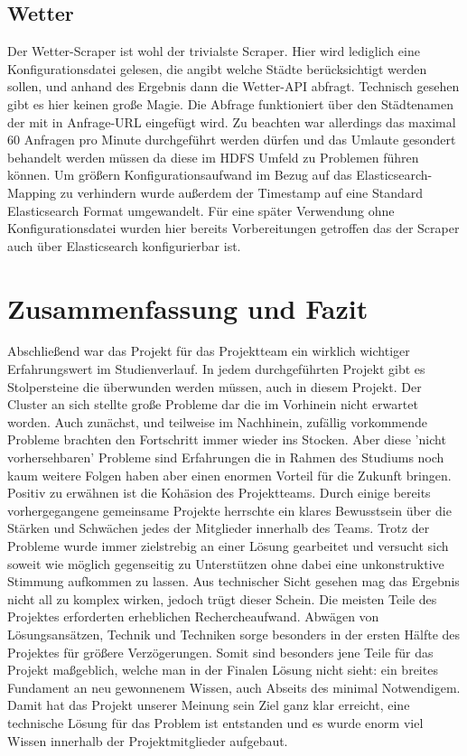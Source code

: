 \documentclass[12pt,oneside,a4paper,parskip]{scrbook}
\begin{document}
\section{Wetter}
Der Wetter-Scraper ist wohl der trivialste Scraper. Hier wird lediglich eine Konfigurationsdatei gelesen, die angibt welche St\"adte ber\"ucksichtigt werden sollen, und anhand des Ergebnis dann die Wetter-API abfragt. Technisch gesehen gibt es hier keinen große Magie. Die Abfrage funktioniert \"uber den Städtenamen der mit in Anfrage-URL eingef\"ugt wird. Zu beachten war allerdings das maximal 60 Anfragen pro Minute durchgef\"uhrt werden d\"urfen und das Umlaute gesondert behandelt werden m\"ussen da diese im HDFS Umfeld zu Problemen f\"uhren k\"onnen. Um gr\"oßern Konfigurationsaufwand im Bezug auf das Elasticsearch-Mapping zu verhindern wurde außerdem der Timestamp auf eine Standard Elasticsearch Format umgewandelt.\newline
F\"ur eine sp\"ater Verwendung ohne Konfigurationsdatei wurden hier bereits Vorbereitungen getroffen das der Scraper auch \"uber Elasticsearch konfigurierbar ist.

\chapter{Zusammenfassung und Fazit}
Abschließend war das Projekt f\"ur das Projektteam ein wirklich wichtiger Erfahrungswert im Studienverlauf. In jedem durchgef\"uhrten Projekt gibt es Stolpersteine die \"uberwunden werden m\"ussen, auch in diesem Projekt. Der Cluster an sich stellte große Probleme dar die im Vorhinein nicht erwartet worden. Auch zun\"achst, und teilweise im Nachhinein, zuf\"allig vorkommende Probleme brachten den Fortschritt immer wieder ins Stocken. Aber diese 'nicht vorhersehbaren' Probleme sind Erfahrungen die in Rahmen des Studiums noch kaum weitere Folgen haben aber einen enormen Vorteil f\"ur die Zukunft bringen. \newline
Positiv zu erw\"ahnen ist die Kohäsion des Projektteams. Durch einige bereits vorhergegangene gemeinsame Projekte herrschte ein klares Bewusstsein \"uber die St\"arken und Schwächen jedes der Mitglieder innerhalb des Teams. Trotz der Probleme wurde immer zielstrebig an einer L\"osung gearbeitet und versucht sich soweit wie m\"oglich gegenseitig zu Unterst\"utzen ohne dabei eine unkonstruktive Stimmung aufkommen zu lassen. \newline 
Aus technischer Sicht gesehen mag das Ergebnis nicht all zu komplex wirken, jedoch tr\"ugt dieser Schein. Die meisten Teile des Projektes erforderten erheblichen Rechercheaufwand. Abwägen von Lösungsansätzen, Technik und Techniken sorge besonders in der ersten Hälfte des Projektes für größere Verzögerungen. Somit sind besonders jene Teile für das Projekt maßgeblich, welche man in der Finalen Lösung nicht sieht: ein breites Fundament an neu gewonnenem Wissen, auch Abseits des minimal Notwendigem. Damit hat das Projekt unserer Meinung sein Ziel ganz klar erreicht, eine technische L\"osung f\"ur das Problem ist entstanden und es wurde enorm viel Wissen innerhalb der Projektmitglieder aufgebaut.
\end{document}
